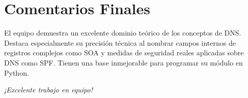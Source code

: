 \documentclass[12pt,a4paper]{article}
\begin{document}
\vspace{1cm}

\section*{Comentarios Finales}
\noindent El equipo demuestra un excelente dominio teórico de los conceptos de DNS. Destaca especialmente su precisión técnica al nombrar campos internos de registros complejos como SOA y medidas de seguridad reales aplicadas sobre DNS como SPF. Tienen una base inmejorable para programar su módulo en Python.

\vspace{0.5cm}
\begin{center}
    \textit{¡Excelente trabajo en equipo!}
\end{center}
\end{document}
